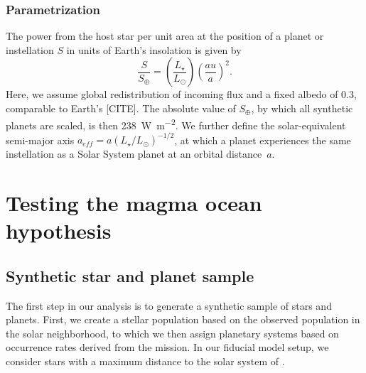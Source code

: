 \documentclass[modern]{aastex631}
\begin{document}
\subsubsection{Parametrization}
\label{sec:mo_model}



\begin{note}
    The power from the host star per unit area at the position of a planet or instellation $S$ in units of Earth's insolation is given by
    \begin{equation}
        \frac{S}{S_\oplus} = \left(\frac{L_\star}{L_\odot}\right) \left(\frac{au}{a}\right)^2 .
    \end{equation}
    Here, we assume global redistribution of incoming flux and a fixed albedo of $0.3$, comparable to Earth's [CITE].
    The absolute value of $S_\oplus$, by which all synthetic planets are scaled, is then \SI{238}{\watt\per\square\meter}.
    We further define the solar-equivalent semi-major axis $a_{eff} = a (L_\star/L_\odot)^{-1/2}$, at which a planet experiences the same instellation as a Solar System planet at an orbital distance~$a$.
\end{note}





\section{Testing the magma ocean hypothesis}

\subsection{Synthetic star and planet sample}
\begin{note}
    The first step in our analysis is to generate a synthetic sample of stars and planets.
    First, we create a stellar population based on the observed population in the solar neighborhood, to which we then assign planetary systems based on occurrence rates derived from the \kepler mission.
    In our fiducial model setup, we consider stars with a maximum distance to the solar system of \dmax.
\end{note}
\end{document}
